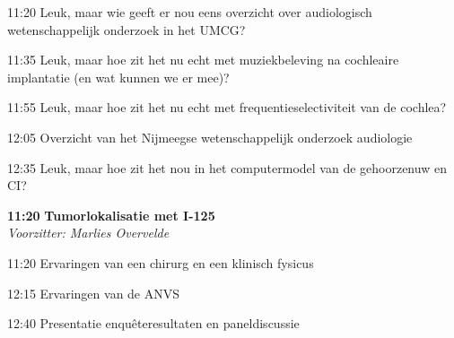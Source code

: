 \documentclass[a4paper,10pt]{report}
\begin{document}
\begin{multicols*}{3}
\begin{packed_enum}
\item[11:20] Leuk, maar wie geeft er nou eens overzicht over audiologisch wetenschappelijk onderzoek in het UMCG?
\item[11:35] Leuk, maar hoe zit het nu echt met muziekbeleving na cochleaire implantatie (en wat kunnen we er mee)?
\item[11:55] Leuk, maar hoe zit het nu echt met frequentieselectiviteit van de cochlea?
\item[12:05] Overzicht van het Nijmeegse wetenschappelijk onderzoek audiologie
\item[12:35] Leuk, maar hoe zit het nou in het computermodel van de gehoorzenuw en CI?
\end{packed_enum} %

\vfill

\begin{packed_enum}
\item[\textbf{11:20}]\textbf{Tumorlokalisatie met I-125}\\\textit{Voorzitter: Marlies Overvelde}
\item[11:20] Ervaringen van een chirurg en een klinisch fysicus
\item[12:15] Ervaringen van de ANVS
\item[12:40] Presentatie enquêteresultaten en paneldiscussie
\end{packed_enum} %

\vfill


\end{multicols*}
\end{document}
